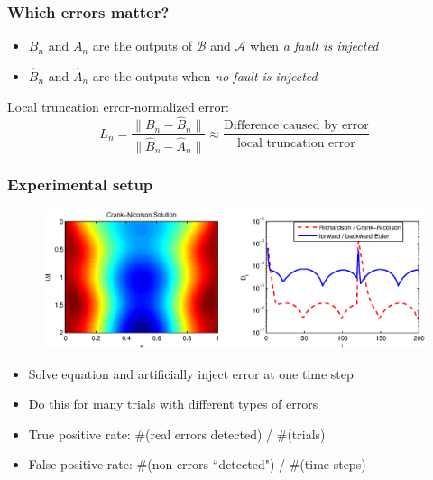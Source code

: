 \documentclass{beamer}
\newcommand{\A}{\mathcal{A}}
\newcommand{\B}{\mathcal{B}}
\begin{document}
%
\begin{frame}
\frametitle{Which errors matter?}

\begin{itemize}
\item $B_n$ and $A_n$ are the outputs of $\B$ and $\A$ when \emph{a fault is injected}
\item $\hat{B}_n$ and $\hat{A}_n$ are the outputs  when \emph{no fault is injected}
\end{itemize}

\begin{center}
Local truncation error-normalized error:
\[
L_n = \frac{\| B_n - \hat{B}_n \|}{\| \hat{B}_n - \hat{A}_n \|} \approx \frac{\text{Difference caused by error}}{\text{local truncation error}}
\]
\end{center}

\end{frame}

\begin{frame}
\frametitle{Experimental setup}

\begin{figure}
  \centering
  \includegraphics[scale=0.4]{figs/heat_soln_diffs1.eps}
\end{figure}

\begin{itemize}
\item Solve equation and artificially inject error at one time step
\pause
\item Do this for many trials with different types of errors
\pause
\item True positive rate: \#(real errors detected) / \#(trials)
\pause
\item False positive rate: \#(non-errors ``detected") / \#(time steps)
\end{itemize}

\end{frame}
\end{document}
